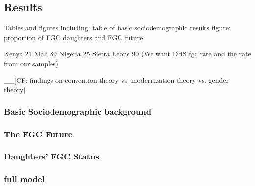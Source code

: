 \documentclass[12pt,]{article}
\begin{document}
\subsection{Results}\label{results-1}

Tables and figures including:
table of basic sociodemographic results
figure:  proportion of FGC daughters and FGC future

Kenya 21%
Mali 89%
Nigeria 25%
Sierra Leone 90%
(We want DHS fgc rate and the rate from our samples)

\_\_{[}CF: findings on convention theory vs. modernization theory vs. gender theory{]}

\subsubsection{Basic Sociodemographic background}\label{Basic-Sociodemographic-background}

\subsubsection{The FGC Future}\label{The-FGC-Future}

\subsubsection{Daughters' FGC Status}\label{Daughters'-FGC-Status}

\subsubsection{full model}\label{full-model}

\end{document}
